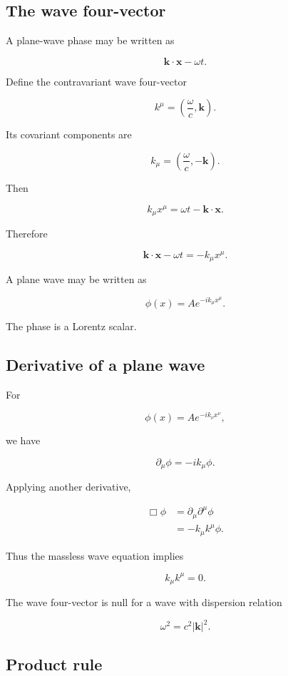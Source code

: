 \subsection{The wave four-vector}

A plane-wave phase may be written as

\[
\mathbf{k}\cdot\mathbf{x}-\omega t.
\]

Define the contravariant wave four-vector

\[
\boxed{
k^{\mu}
=
\left(
\frac{\omega}{c},
\mathbf{k}
\right)
}.
\]

Its covariant components are

\[
\boxed{
k_{\mu}
=
\left(
\frac{\omega}{c},
-\mathbf{k}
\right)
}.
\]

Then

\[
k_{\mu}x^{\mu}
=
\omega t-
\mathbf{k}\cdot\mathbf{x}.
\]

Therefore

\[
\mathbf{k}\cdot\mathbf{x}-\omega t
=
-k_{\mu}x^{\mu}.
\]

A plane wave may be written as

\[
\phi(x)
=
A e^{-ik_{\mu}x^{\mu}}.
\]

The phase is a Lorentz scalar.

\subsection{Derivative of a plane wave}

For

\[
\phi(x)
=
A e^{-ik_{\nu}x^{\nu}},
\]

we have

\[
\partial_{\mu}\phi
=
-ik_{\mu}\phi.
\]

Applying another derivative,

\[
\begin{aligned}
\Box\phi
&=
\partial_{\mu}\partial^{\mu}\phi\\
&=
-k_{\mu}k^{\mu}\phi.
\end{aligned}
\]

Thus the massless wave equation implies

\[
\boxed{
k_{\mu}k^{\mu}=0
}.
\]

The wave four-vector is null for a wave with dispersion relation

\[
\omega^{2}=c^{2}|\mathbf{k}|^{2}.
\]

\subsection{Product rule}

